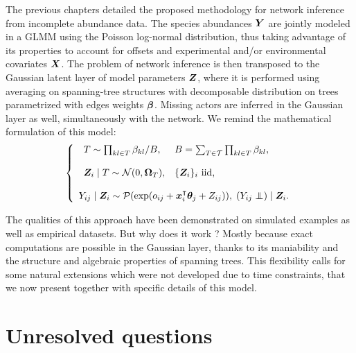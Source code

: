 
 \vspace{0.5cm}
 
 The previous chapters detailed the proposed methodology for network inference from incomplete abundance data. The species abundances ${\boldsymbol{Y}}$ are jointly modeled in a GLMM using the Poisson log-normal distribution, thus taking advantage of its properties to account for offsets and experimental and/or environmental covariates ${\boldsymbol{X}}$. The problem of network inference is then transposed to the Gaussian latent layer of model parameters ${\boldsymbol{Z}}$, where it is performed using averaging on spanning-tree structures with decomposable distribution on trees parametrized with edges weights ${\boldsymbol{\beta}}$. Missing actors are inferred in the Gaussian layer as well, simultaneously with the network. We remind the mathematical formulation of this model:
  \begin{equation*}
 \left\{ \begin{array}{l}
 \begin{array}{ll}
 T\sim \prod_{kl\in T} \beta_{kl} / B, &B= \sum_{T\in\mathcal{T}} \prod_{kl \in T} \beta_{kl},\\\\
 \Zbf_i\mid T  \sim \Ncal (0, \Omegab_T), &\{\Zbf_i\}_i \text{ iid, }\\
 \end{array} \\\\
 Y_{ij}\mid \Zbf_i\sim \Pcal (\exp (o_{ij}+\xb_i^\intercal \thetab_j + Z_{ij})), \; (Y_{ij} \independent) \mid \Zbf_i .
 \end{array} \right. 
 \end{equation*}
 
 The qualities of this approach have been demonstrated on simulated examples as well as empirical datasets. But why does it work ? Mostly because exact computations are possible in the Gaussian layer, thanks to its maniability and the structure and algebraic properties of spanning trees.  This flexibility calls for some natural extensions which were not developed due to time constraints, that we now present together with specific details of this model.
 
 
\section{Unresolved questions}
